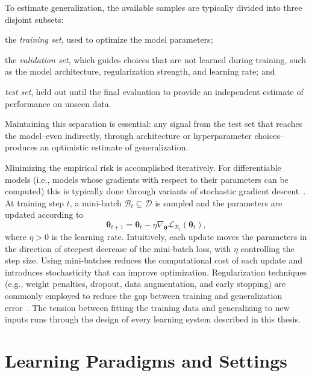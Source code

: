 To estimate generalization, the available samples are typically divided 
 into three disjoint subsets: 
\begin{enumerate*}[label=(\roman*)]
    \item the \emph{training set}, used to optimize the model parameters;
    \item the \emph{validation set}, which guides choices that are not learned during training,
        such as the model architecture, regularization strength, and learning rate; and
    \item \emph{test set}, held out until the final evaluation to provide 
        an independent estimate of performance on unseen data.
\end{enumerate*}
%
Maintaining this separation is essential: any signal from the test set that
 reaches the model--even indirectly, through architecture or hyperparameter choices--produces 
 an optimistic estimate of generalization.

Minimizing the empirical risk is accomplished iteratively.
%
For differentiable models (i.e., models whose gradients with respect to their parameters can be computed) 
 this is typically done through variants of stochastic gradient descent~\cite{DBLP:journals/siamrev/BottouCN18}.
%
At training step $t$, a mini-batch $\mathcal{B}_t \subseteq \mathcal{D}$ is
sampled and the parameters are updated according to
%
\begin{equation}
    \boldsymbol{\theta}_{t+1}
    =
    \boldsymbol{\theta}_{t}
    -
    \eta
    \nabla_{\boldsymbol{\theta}}
    \mathcal{L}_{\mathcal{B}_t}
    \left(
        \boldsymbol{\theta}_{t}
    \right),
    \label{eq:gradient-descent}
\end{equation}
%
where $\eta > 0$ is the learning rate.
Intuitively, 
 each update moves the parameters in the direction of steepest decrease 
 of the mini-batch loss, with $\eta$ controlling the step size.
%
Using mini-batches reduces the computational cost of each update and introduces
stochasticity that can improve optimization.
%
Regularization techniques (e.g., weight penalties, dropout, data
 augmentation, and early stopping) are commonly employed to reduce the gap
 between training and generalization error~\cite{DBLP:books/daglib/0040158}.
%
The tension between fitting the training data and generalizing to new inputs
 runs through the design of every learning system described in this thesis.


\section{Learning Paradigms and Settings}
\label{sec:learning-paradigms}

